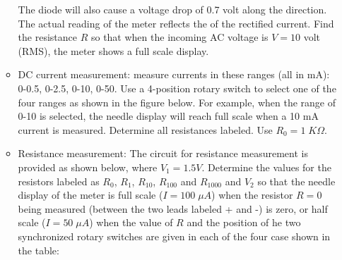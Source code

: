 \begin{enumerate}
\begin{itemize}

      The diode will also cause a voltage drop of 0.7 volt 
      along the direction. The actual reading of the meter reflects the 
      of the rectified current. Find the resistance $R$ so 
      that when the incoming AC voltage is $V=10$ volt (RMS), the meter shows 
      a full scale display.



    \item DC current measurement: measure currents in these ranges (all in mA):
      0-0.5, 0-2.5, 0-10, 0-50. Use a 4-position rotary switch to select one 
      of the four ranges as shown in the figure below. For example, when the 
      range of 0-10 is selected, the needle display will reach full scale when 
      a 10 mA current is measured. Determine all resistances labeled. Use
      $R_0=1\;K\Omega$.



    \item Resistance measurement: The circuit for resistance measurement is
      provided as shown below, where $V_1=1.5V$. Determine the values for the 
      resistors labeled as $R_0$, $R_1$, $R_{10}$, $R_{100}$ and $R_{1000}$ 
      and $V_2$ so that the needle display of the meter is full scale 
      ($I=100\;\mu A$) when the resistor $R=0$ being measured (between the 
      two leads labeled + and -) is zero, or half scale ($I=50\;\mu A$) when 
      the value of $R$ and the position of he two synchronized rotary switches
      are given in each of the four case shown in the table:


\end{itemize}
\end{enumerate}
